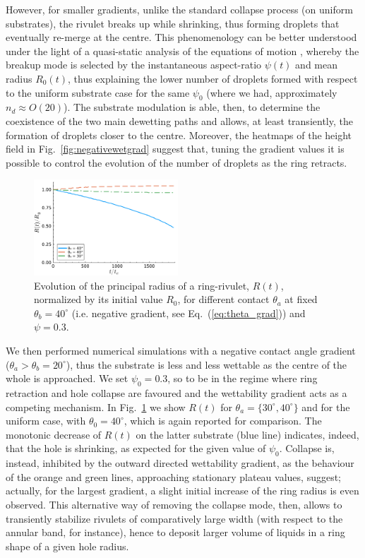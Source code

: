 \documentclass[%
 aip,
 amsmath,amssymb,
 reprint,%
]{revtex4-1}
\begin{document}
However, for smaller gradients, unlike the standard collapse process (on uniform substrates), the rivulet breaks up while shrinking, thus forming droplets that eventually re-merge at the centre.
This phenomenology can be better understood under the light of a quasi-static analysis of the equations of motion \cite{gonzalezStabilityLiquidRing2013}, whereby the breakup mode is selected by the instantaneous aspect-ratio $\psi(t)$ and mean radius $R_0(t)$, thus explaining the lower number of droplets formed with respect to the uniform substrate case for the same $\psi_0$ (where we had, approximately $n_d \approx O(20)$).
The substrate modulation is able, then, to determine the coexistence of the two main dewetting paths and allows, at least transiently, the formation of droplets closer to the centre. 
Moreover, the heatmaps of the height field in Fig.~\ref{fig:negativewetgrad} suggest that, tuning the gradient values it is possible to control the evolution of the number of droplets as the ring retracts.\\
\begin{figure}
    \centering
    \includegraphics[width=0.48\textwidth]{Figure_8.pdf}
    \caption{Evolution of the principal radius of a ring-rivulet, $R(t)$, normalized by its initial value $R_0$, for different contact $\theta_a$ at fixed $\theta_b = 40^{\circ}$ (i.e. negative gradient, see Eq.~(\ref{eq:theta_grad})) and $\psi = 0.3$.}
    \label{fig:positivewetgrad}
\end{figure}
We then performed numerical simulations with a negative contact angle gradient ($\theta_a > \theta_b = 20^{\circ}$), thus the substrate is less and less wettable as the centre of the whole is approached.
We set $\psi_0 = 0.3$, so to be in the regime where ring retraction and hole collapse are favoured and the wettability gradient acts as a competing mechanism.
In Fig.~\ref{fig:positivewetgrad} we show $R(t)$ for $\theta_a = \{ 30^{\circ}, 40^{\circ} \}$ and for the uniform case, with $\theta_0 = 40^{\circ}$, which is again reported for comparison.
The monotonic decrease of $R(t)$ on the latter substrate (blue line) indicates, indeed, that the hole is shrinking, as expected for the given value of $\psi_0$. 
Collapse is, instead, inhibited by the outward directed wettability gradient, as the behaviour of the orange and green lines, approaching stationary plateau values, suggest; actually, for the largest gradient, a slight initial increase of the ring radius is even observed. 
This alternative way of removing the collapse mode, then, allows to transiently stabilize rivulets of comparatively large width (with respect to the annular band, for instance), hence to deposit larger volume of liquids in a ring shape of a given hole radius. 
\end{document}

